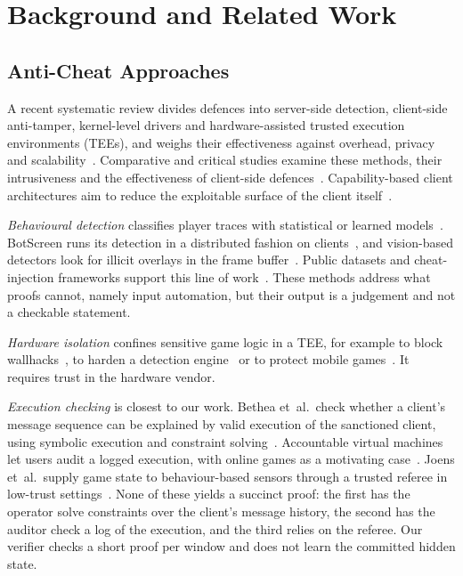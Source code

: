 \documentclass[conference]{IEEEtran}
\begin{document}
\section{Background and Related Work}

\subsection{Anti-Cheat Approaches}
A recent systematic review divides defences into server-side detection, client-side anti-tamper, kernel-level drivers and hardware-assisted trusted execution environments (TEEs), and weighs their effectiveness against overhead, privacy and scalability~\cite{alangari2025}.
Comparative and critical studies examine these methods, their intrusiveness and the effectiveness of client-side defences~\cite{lehtonen2020,gjonbalaj2023,dorner2024,collins2024}.
Capability-based client architectures aim to reduce the exploitable surface of the client itself~\cite{oster2025}.

\emph{Behavioural detection} classifies player traces with statistical or learned models~\cite{laurens2007,pao2010,alayed2013,pinto2021,loo2025,dhinge2026}.
BotScreen runs its detection in a distributed fashion on clients~\cite{choi2023}, and vision-based detectors look for illicit overlays in the frame buffer~\cite{jonnalagadda2021}.
Public datasets and cheat-injection frameworks support this line of work~\cite{bertin2026,shaikh2025}.
These methods address what proofs cannot, namely input automation, but their output is a judgement and not a checkable statement.

\emph{Hardware isolation} confines sensitive game logic in a TEE, for example to block wallhacks~\cite{park2020}, to harden a detection engine~\cite{brandao2020} or to protect mobile games~\cite{jeon2021}.
It requires trust in the hardware vendor.

\emph{Execution checking} is closest to our work.
Bethea et~al.\ check whether a client's message sequence can be explained by valid execution of the sanctioned client, using symbolic execution and constraint solving~\cite{bethea2011}.
Accountable virtual machines let users audit a logged execution, with online games as a motivating case~\cite{haeberlen2010}.
Joens et~al.\ supply game state to behaviour-based sensors through a trusted referee in low-trust settings~\cite{joens2024}.
None of these yields a succinct proof: the first has the operator solve constraints over the client's message history, the second has the auditor check a log of the execution, and the third relies on the referee.
Our verifier checks a short proof per window and does not learn the committed hidden state.
\end{document}
